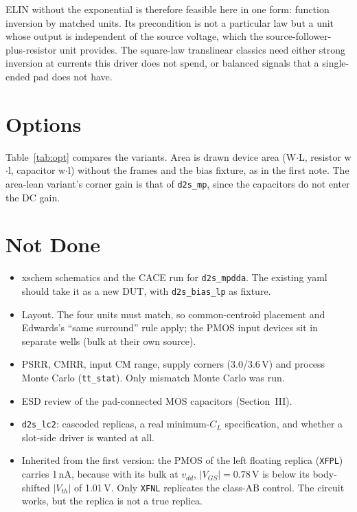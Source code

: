\documentclass[journal]{IEEEtran}
\newcommand{\cell}[1]{\texttt{#1}}
\begin{document}
ELIN without the exponential is therefore feasible here in one form: function inversion by
matched units. Its precondition is not a particular law but a unit whose output is
independent of the source voltage, which the source-follower-plus-resistor unit provides.
The square-law translinear classics need either strong inversion at currents this driver
does not spend, or balanced signals that a single-ended pad does not have.

\section{Options}
Table~\ref{tab:opt} compares the variants. Area is drawn device area (W$\cdot$L, resistor
w$\cdot$l, capacitor w$\cdot$l) without the frames and the bias fixture, as in the first
note. The area-lean variant's corner gain is that of \cell{d2s\_mp}, since the capacitors do
not enter the DC gain.



\section{Not Done}
\begin{itemize}
\item xschem schematics and the CACE run for \cell{d2s\_mpdda}. The existing yaml should take
it as a new DUT, with \cell{d2s\_bias\_lp} as fixture.
\item Layout. The four units must match, so common-centroid placement and Edwards's ``same
surround'' rule \cite[\S3.10]{edwards_thesis} apply; the PMOS input devices sit in separate
wells (bulk at their own source).
\item PSRR, CMRR, input CM range, supply corners (3.0/3.6\,V) and process Monte Carlo
(\cell{tt\_stat}). Only mismatch Monte Carlo was run.
\item ESD review of the pad-connected MOS capacitors (Section~III).
\item \cell{d2s\_lc2}: cascoded replicas, a real minimum-$C_L$ specification, and whether a
slot-side driver is wanted at all.
\item Inherited from the first version: the PMOS of the left floating replica (\cell{XFPL})
carries 1\,nA, because with its bulk at $v_{dd}$, $|V_{GS}|=0.78$\,V is below its
body-shifted $|V_{th}|$ of 1.01\,V. Only \cell{XFNL} replicates the class-AB control. The
circuit works, but the replica is not a true replica.
\end{itemize}
\end{document}
